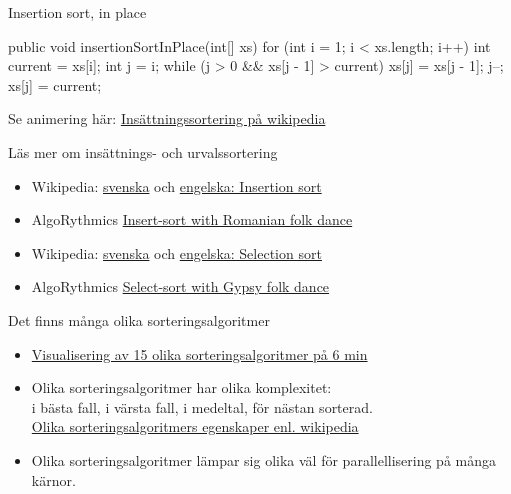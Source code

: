\documentclass{lecturenotes}
\begin{document}
\begin{Slide}{Insertion sort, in place}
\begin{Code}
    public void insertionSortInPlace(int[] xs) {
        for (int i = 1; i < xs.length; i++) {
            int current = xs[i];
            int j = i;
            while (j > 0 && xs[j - 1] > current) {
                xs[j] = xs[j - 1];
                j--;
            }
            xs[j] = current;
        }
    }
\end{Code}
Se animering här: \href{https://sv.wikipedia.org/wiki/Ins\%C3\%A4ttningssortering}{Insättningssortering på wikipedia}
\end{Slide}

\begin{Slide}{Läs mer om insättnings- och urvalssortering}
\begin{itemize}
\item Wikipedia: \href{https://sv.wikipedia.org/wiki/Ins\%C3\%A4ttningssortering}{svenska} och 
\href{https://en.wikipedia.org/wiki/Insertion_sort}{engelska: Insertion sort} 

\item AlgoRythmics \href{https://www.youtube.com/watch?v=ROalU379l3U}{Insert-sort with Romanian folk dance  }
\end{itemize}

\vspace{2em}

\begin{itemize}
\item Wikipedia: \href{https://sv.wikipedia.org/wiki/Urvalssortering}{svenska} och 
\href{https://en.wikipedia.org/wiki/Selection_sort}{engelska: Selection sort} 

\item AlgoRythmics \href{https://www.youtube.com/watch?v=Ns4TPTC8whw}{Select-sort with Gypsy folk dance }
\end{itemize}
\end{Slide}

\begin{Slide}{Det finns många olika sorteringsalgoritmer}
\begin{itemize}
\item \href{https://www.youtube.com/watch?v=kPRA0W1kECg}{Visualisering av 15 olika sorteringsalgoritmer på 6 min}
\item Olika sorteringsalgoritmer har olika komplexitet: \\ i bästa fall, i värsta fall, i medeltal, för nästan sorterad. \\
\href{https://en.wikipedia.org/wiki/Sorting_algorithm}{Olika sorteringsalgoritmers egenskaper enl. wikipedia}
\item Olika sorteringsalgoritmer lämpar sig olika väl för parallellisering på många kärnor.
\end{itemize}
\end{Slide}
\end{document}
